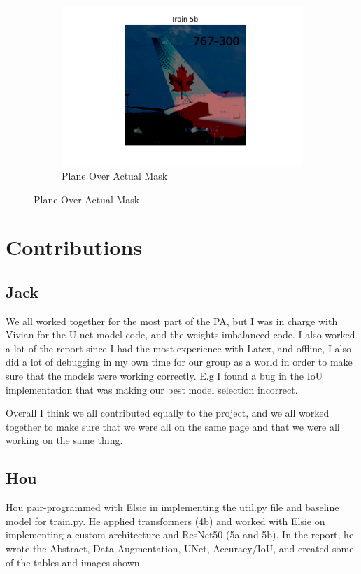 \documentclass{article}
\begin{document}
\begin{figure}[h]
  \begin{subfigure}[b]{0.45\textwidth}
    \centering
    \includegraphics[width=\textwidth]{include/best model/plane1_over_actual.png} %
    \caption{Plane Over Actual Mask}
  \end{subfigure}
  \label{fig:best_models2}
\end{figure}


\newpage
\section{Contributions}

\subsection{Jack}
We all worked together for the most part of the PA, but I was in charge with Vivian for the U-net model code, and the weights imbalanced code. I also worked a lot of the report since I had the most experience with Latex, and offline, I also did a lot of debugging in my own time for our group as a world in order to make sure that the models were working correctly. E.g I found a bug in the IoU implementation that was making our best model selection incorrect.

Overall I think we all contributed equally to the project, and we all worked together to make sure that we were all on the same page and that we were all working on the same thing.


\subsection{Hou}
Hou pair-programmed with Elsie in implementing the util.py file and baseline model for train.py. He applied transformers (4b) and worked with Elsie on implementing a custom architecture and ResNet50 (5a and 5b). In the report, he wrote the Abstract, Data Augmentation, UNet, Accuracy/IoU, and created some of the tables and images shown. 
\end{document}
